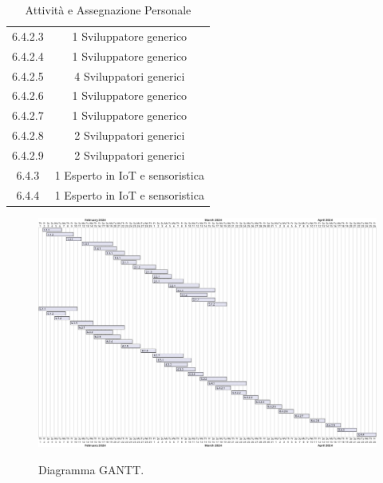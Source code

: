 \begin{table}[H]
\begin{tabular}{|c|c|}
        6.4.2.3           & 1 Sviluppatore generico                                      \\
        6.4.2.4           & 1 Sviluppatore generico                                      \\
        6.4.2.5           & 4 Sviluppatori generici                                      \\
        6.4.2.6           & 1 Sviluppatore generico                                      \\
        6.4.2.7           & 1 Sviluppatore generico                                      \\
        6.4.2.8           & 2 Sviluppatori generici                                      \\
        6.4.2.9           & 2 Sviluppatori generici                                      \\
        6.4.3             & 1 Esperto in IoT e sensoristica                              \\
        6.4.4             & 1 Esperto in IoT e sensoristica                              \\
        \hline
    \end{tabular}
    \caption{Attività e Assegnazione Personale}
    \label{tab:attivita-personale}
\end{table}

\begin{figure}[H]
    \centering
    \caption{Diagramma GANTT.}
    \includegraphics[height=\textwidth, angle=90]{figures/GANTT.png}
    \label{fig:gantt}
\end{figure}

